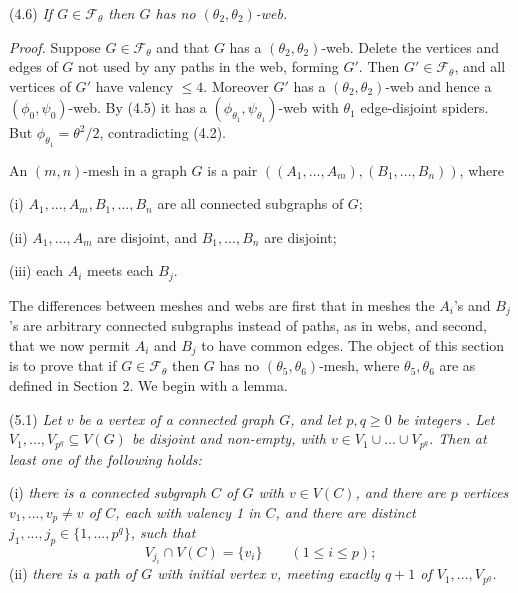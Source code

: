 \stmt
(4.6) \textit{If $G \in \mathcal{F}_\theta$ then $G$ has no $(\theta_2, \theta_2)$-web.}

\textit{Proof.} Suppose $G \in \mathcal{F}_\theta$ and that $G$ has a $(\theta_2, \theta_2)$-web. Delete the vertices and edges of $G$ not used by any paths in the web, forming $G'$. Then $G' \in \mathcal{F}_\theta$, and all vertices of $G'$ have valency $\le 4$. Moreover $G'$ has a $(\theta_2, \theta_2)$-web and hence a $(\phi_0, \psi_0)$-web. By (4.5) it has a $(\phi_{\theta_1}, \psi_{\theta_1})$-web with $\theta_1$ edge-disjoint spiders. But $\phi_{\theta_1} = \theta^2/2$, contradicting (4.2).


An $(m, n)$-mesh in a graph $G$ is a pair $((A_1, ..., A_m), (B_1, ..., B_n))$, where

\hspace*{12pt}(i) $A_1, ..., A_m, B_1, ..., B_n$ are all connected subgraphs of $G$;

\hspace*{12pt}(ii) $A_1, ..., A_m$ are disjoint, and $B_1, ..., B_n$ are disjoint;

\hspace*{12pt}(iii) each $A_i$ meets each $B_j$.

The differences between meshes and webs are first that in meshes the $A_i$'s and $B_j$'s are arbitrary connected subgraphs instead of paths, as in webs, and second, that we now permit $A_i$ and $B_j$ to have common edges. The object of this section is to prove that if $G \in \mathcal{F}_\theta$ then $G$ has no $(\theta_5, \theta_6)$-mesh, where $\theta_5, \theta_6$ are as defined in Section 2. We begin with a lemma.

\stmt
(5.1) \textit{Let $v$ be a vertex of a connected graph $G$, and let $p, q \ge 0$ be integers . Let $V_1, ..., V_{p^q} \subseteq V(G)$ be disjoint and non-empty, with $v \in V_1 \cup \dots \cup V_{p^q}$. Then at least one of the following holds:}

\hspace*{12pt}(i) \textit{there is a connected subgraph $C$ of $G$ with $v \in V(C)$, and there are $p$ vertices $v_1, ..., v_p \ne v$ of $C$, each with valency 1 in $C$, and there are distinct $j_1, ..., j_p \in \{1, ..., p^q\}$, such that}
\begin{equation*}
V_{j_i} \cap V(C) = \{v_i\} \qquad (1 \le i \le p);
\end{equation*}
\hspace*{12pt}(ii) \textit{there is a path of $G$ with initial vertex $v$, meeting exactly $q+1$ of $V_1, ..., V_{p^q}$.}

